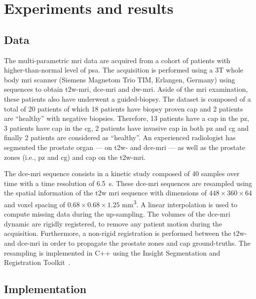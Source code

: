 \section{Experiments and results}\label{sec:experiments}

\subsection{Data}\label{sec:data}

The multi-parametric \ac{mri} data are acquired from a cohort of patients with higher-than-normal level of \ac{psa}.
The acquisition is performed using a 3T whole body \ac{mri} scanner (Siemens Magnetom Trio TIM, Erlangen, Germany) using sequences to obtain \ac{t2w}-\ac{mri}, \ac{dce}-\ac{mri} and \ac{dw}-\ac{mri}.
Aside of the \ac{mri} examination, these patients also have underwent a guided-biopsy.
The dataset is composed of a total of 20 patients of which 18 patients have biopsy proven \ac{cap} and 2 patients are ``healthy'' with negative biopsies.
Therefore, 13 patients have a \ac{cap} in the \ac{pz}, 3 patients have \ac{cap} in the \ac{cg}, 2 patients have invasive \ac{cap} in both \ac{pz} and \ac{cg} and finally 2 patients are considered as ``healthy''.
An experienced radiologist has segmented the prostate organ --- on \ac{t2w}- and \ac{dce}-\ac{mri} --- as well as the prostate zones (i.e., \ac{pz} and \ac{cg}) and \ac{cap} on the \ac{t2w}-\ac{mri}.

The \ac{dce}-\ac{mri} sequence consists in a kinetic study composed of 40 samples over time with a time resolution of \SI{6.5}{\second}.
These \ac{dce}-\ac{mri} sequences are resampled using the spatial information of the \ac{t2w} \ac{mri} sequence with dimensions of $448 \times 360 \times 64$ and voxel spacing of $0.68 \times 0.68 \times 1.25 $ mm\textsuperscript{3}.
A linear interpolation is used to compute missing data during the up-sampling.
The volumes of the \ac{dce}-\ac{mri} dynamic are rigidly registered, to remove any patient motion during the acquisition.
Furthermore, a non-rigid registration is performed between the \ac{t2w}- and \ac{dce}-\ac{mri} in order to propagate the prostate zones and \ac{cap} ground-truths.
The resampling is implemented in C++ using the Insight Segmentation and Registration Toolkit~\citep{ibanez2005itk}.

\subsection{Implementation}

